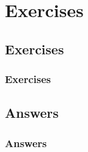 \section{Exercises}
\subsection{Exercises}

\begin{frame}
\frametitle{Exercises}

% 

\end{frame}

\subsection{Answers}



\begin{frame}
\frametitle{Answers}

\end{frame}